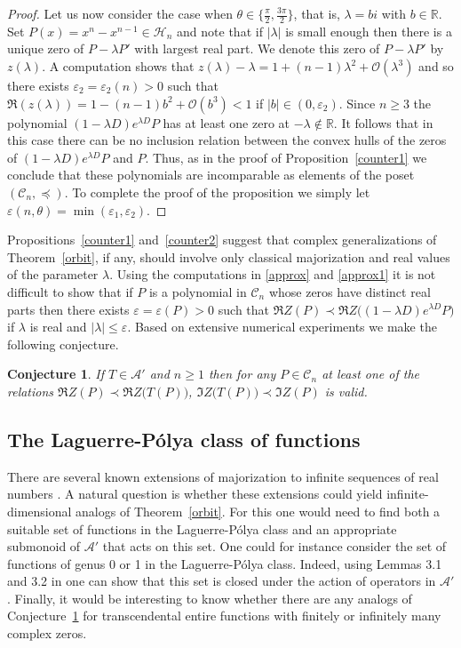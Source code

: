 \documentclass[10pt,twoside,a4paper,reqno]{amsart}
\theoremstyle{plain}
\newtheorem{conjecture}      {Conjecture}
\theoremstyle{definition}
\theoremstyle{remark}
\newcommand {\bR} {\mathbb {R}}
\newcommand {\la} {\lambda}
\newcommand {\te} {\theta}
\newcommand {\ve} {\varepsilon}
\newcommand {\calH} {\mathcal {H}}
\newcommand {\calC} {\mathcal {C}}
\newcommand {\calA} {\mathcal {A}}
\newcommand {\calO} {\mathcal {O}}
\begin{document}
\begin{proof}
Let us now consider the case when $\te\in \{\frac{\pi}{2},\frac{3\pi}{2}\}$, 
that is, $\la=bi$ with $b\in \bR$. Set 
$P(x)=x^n-x^{n-1}\in \calH_n$ and note that if $|\la|$ is small enough then 
there is a unique zero of $P-\la P'$ with largest real part. We denote this 
zero of $P-\la P'$
by $z(\la)$. A computation shows that $z(\la)-\la=1+(n-1)\la^2+\calO(\la^3)$ 
and so there exists $\ve_2=\ve_2(n)>0$ such that $\Re(z(\la))=1-(n-1)b^2+
\calO(b^3)<1$ if $|b|\in (0,\ve_2)$. Since $n\ge 3$ the polynomial 
$(1-\la D)e^{\la D}P$ has at least one zero at $-\la\notin \bR$. It follows 
that in this case there can be no inclusion relation between the 
convex hulls of the zeros of $(1-\la D)e^{\la D}P$ and $P$. Thus, as in the 
proof of 
Proposition~\ref{counter1} we conclude that these polynomials are 
incomparable as elements of the poset $(\calC_{n},\preccurlyeq)$. To complete 
the proof of the proposition we simply let $\ve(n,\te)=\min(\ve_1,\ve_2)$.
\end{proof}

Propositions~\ref{counter1} and~\ref{counter2} suggest that complex 
generalizations of Theorem~\ref{orbit}, if any, should involve only classical 
majorization and real values of the parameter $\la$. Using the computations 
in \eqref{approx} and \eqref{approx1} 
it is not difficult to show that if $P$ is a polynomial in $\calC_n$ whose 
zeros have distinct real parts then there exists $\ve=\ve(P)>0$ such that 
$\Re Z(P)\prec \Re Z\big((1-\la D)e^{\la D}P\big)$ if $\la$ is real and 
$|\la|\le \ve$. Based on extensive numerical experiments we make the 
following conjecture.

\begin{conjecture}\label{conj1}
If $T\in \calA'$ and $n\ge 1$ then for any $P\in \calC_n$ at least one of 
the relations $\Re Z(P)\prec \Re Z\big(T(P)\big)$, $\Im Z\big(T(P)\big)\prec
\Im Z(P)$ is valid. 
\end{conjecture}

\subsection{The Laguerre-P\'olya class of functions}

There are several known extensions of majorization to infinite sequences of 
real numbers \cite[p.~16]{MO}. A natural question is whether 
these extensions could yield infinite-dimensional analogs of 
Theorem~\ref{orbit}. For this one would need to find both a suitable
set of functions in the Laguerre-P\'olya class and an appropriate 
submonoid of $\calA'$ that acts on this set. One could for instance
consider the set of functions of genus 0 or 1 in the Laguerre-P\'olya class. 
Indeed, using Lemmas 3.1 and 3.2 in \cite{CC2} one can show that this set is 
closed under the action of operators in $\calA'$. Finally, it would be 
interesting to know whether there are any analogs of Conjecture~\ref{conj1} 
for transcendental entire functions with finitely or infinitely many 
complex zeros.
\end{document}
